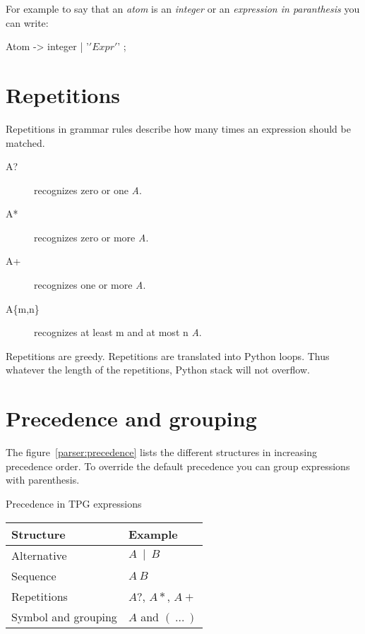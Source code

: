 For example to say that an \emph{atom} is an \emph{integer} or an \emph{expression in paranthesis}
you can write:
\begin{verbatimtab}[4]
	Atom -> integer | '\(' Expr '\)' ;
\end{verbatimtab}

\section{Repetitions}											\label{parser:repetitions}

Repetitions in grammar rules describe how many times an expression should be matched.

\begin{description}
	\item [A?] recognizes zero or one \emph{A}.
	\item [A*] recognizes zero or more \emph{A}.
	\item [A+] recognizes one or more \emph{A}.
	\item [A\{m,n\}] recognizes at least m and at most n \emph{A}.
\end{description}

Repetitions are greedy.
Repetitions are translated into Python loops.
Thus whatever the length of the repetitions, Python stack will not overflow. 

\section{Precedence and grouping}

The figure~\ref{parser:precedence} lists the different structures in increasing precedence order.
To override the default precedence you can group expressions with parenthesis.

\begin{tableau}
\caption{Precedence in TPG expressions}							\label{parser:precedence}
\begin{tabular}{| l | l |}
\hline
	Structure			& Example \\
\hline
\hline
	Alternative			& $A~\mid~B$ \\
\hline
	Sequence			& $A~B$ \\
\hline
	Repetitions			& $A?$, $A*$, $A+$ \\
\hline
	Symbol and grouping	& $A$ and $(~\ldots~)$ \\
\hline
\end{tabular}
\end{tableau}


